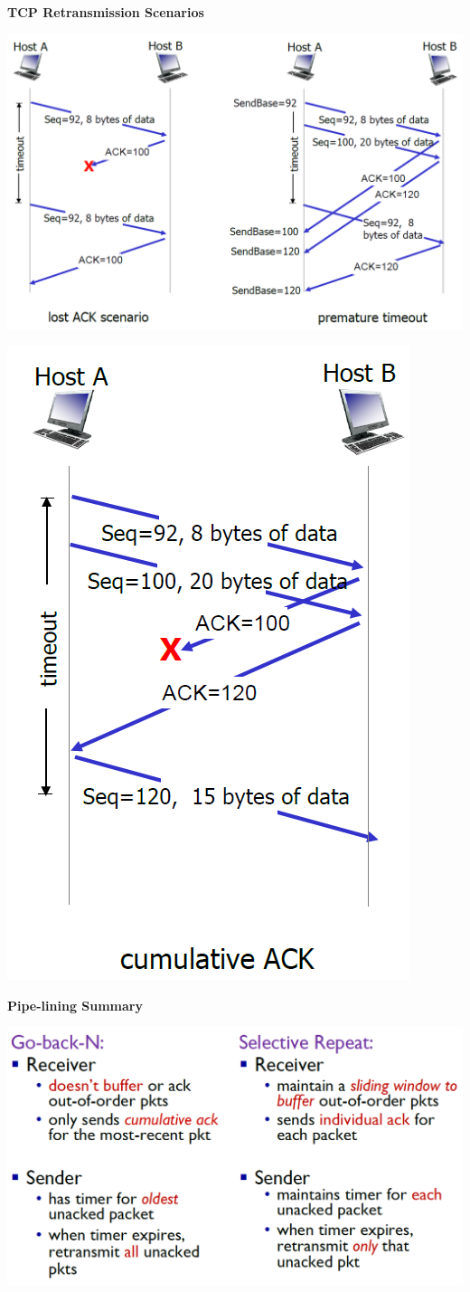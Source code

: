 \documentclass[10pt,landscape,a4paper]{article}
\begin{document}
\begin{multicols*}{4}
\begin{center}
        \end{center}
        \textbf{TCP Retransmission Scenarios}
        \begin{center}
            \includegraphics[width=0.7\columnwidth]{tcp_retransmission_1}
        \end{center}
        \begin{center}
            \includegraphics[width=0.3\columnwidth]{tcp_retransmission_2}
        \end{center}
        \textbf{Pipe-lining Summary}
        \begin{center}
            \includegraphics[width=0.9\columnwidth]{gbn_sr_summary}
        \end{center}

\end{multicols*}
\end{document}

